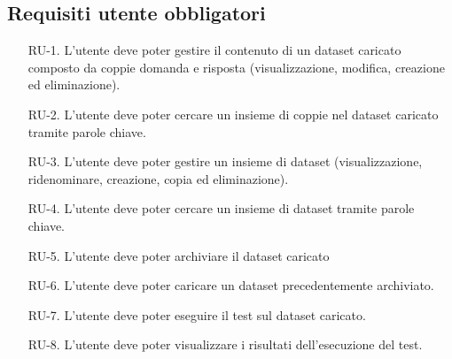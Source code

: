 \subsection{Requisiti utente obbligatori}
\begin{enumerate}

    \label{item:RU-1}
    \item[RU-1.] L'utente deve poter gestire il contenuto di un dataset caricato composto da coppie domanda e risposta (visualizzazione,
     modifica, creazione ed eliminazione).
    
    \label{item:RU-2}
    \item[RU-2.] L'utente deve poter cercare un insieme di coppie nel dataset caricato tramite parole chiave.
    
    \label{item:RU-3}
    \item[RU-3.] L'utente deve poter gestire un insieme di dataset (visualizzazione, ridenominare, creazione, copia ed eliminazione).
    
    \label{item:RU-4}
    \item[RU-4.] L'utente deve poter cercare un insieme di dataset tramite parole chiave.
    
    \label{item:RU-5}
    \item[RU-5.] L'utente deve poter archiviare il dataset caricato
    
    \label{item:RU-6}
    \item[RU-6.] L'utente deve poter caricare un dataset precedentemente archiviato.
    
    \label{item:RU-7}
    \item[RU-7.] L'utente deve poter eseguire il test sul dataset caricato.
    
    \label{item:RU-8}
    \item[RU-8.] L'utente deve poter visualizzare i risultati dell’esecuzione del test.
\end{enumerate}

